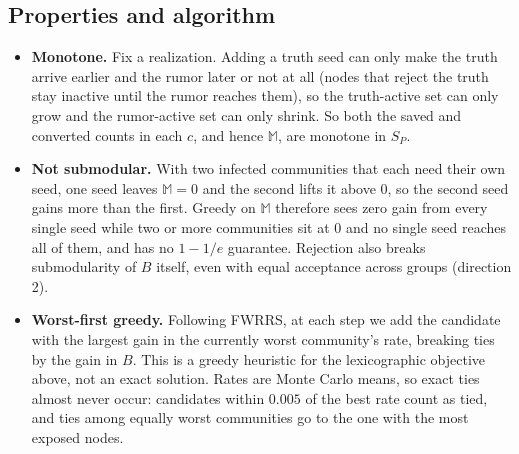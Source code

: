 \subsection{Properties and algorithm}
\begin{itemize}
\item \textbf{Monotone.} Fix a realization. Adding a truth seed can only make the truth arrive earlier and the rumor later or not at all (nodes that reject the truth stay inactive until the rumor reaches them), so the truth-active set can only grow and the rumor-active set can only shrink. So both the saved and converted counts in each $c$, and hence $\mathbb{M}$, are monotone in $S_P$.
\item \textbf{Not submodular.} With two infected communities that each need their own seed, one seed leaves $\mathbb{M}=0$ and the second lifts it above $0$, so the second seed gains more than the first. Greedy on $\mathbb{M}$ therefore sees zero gain from every single seed while two or more communities sit at $0$ and no single seed reaches all of them, and has no $1-1/e$ guarantee. Rejection also breaks submodularity of $B$ itself, even with equal acceptance across groups (direction 2).
\item \textbf{Worst-first greedy.} Following FWRRS, at each step we add the candidate with the largest gain in the currently worst community's rate, breaking ties by the gain in $B$. This is a greedy heuristic for the lexicographic objective above, not an exact solution. Rates are Monte Carlo means, so exact ties almost never occur: candidates within $0.005$ of the best rate count as tied, and ties among equally worst communities go to the one with the most exposed nodes.
\end{itemize}

